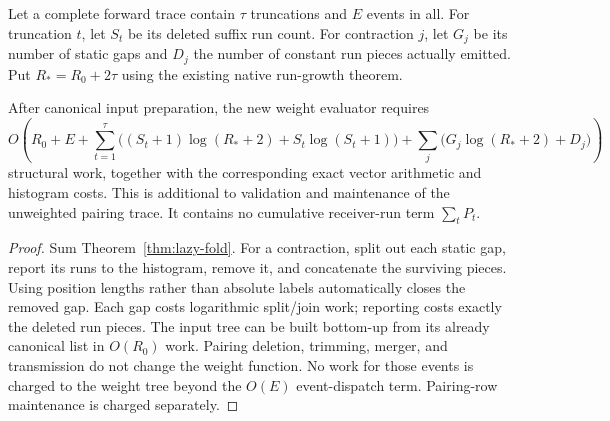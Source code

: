 Let a complete forward trace contain $\tau$ truncations and $E$ events in
all. For truncation $t$, let $S_t$ be its deleted suffix run count. For
contraction $j$, let $G_j$ be its number of static gaps and $D_j$ the number
of constant run pieces actually emitted. Put $R_* = R_0+2\tau$ using the
existing native run-growth theorem.

\begin{corollary}
\label{cor:lazy-replay}
After canonical input preparation, the new weight evaluator requires
\[
 O\left(
 R_0+E+\sum_{t=1}^{\tau}
       \bigl((S_t+1)\log(R_*+2)+S_t\log(S_t+1)\bigr)
 +\sum_j\bigl(G_j\log(R_*+2)+D_j\bigr)
 \right)
\]
structural work, together with the corresponding exact vector arithmetic
and histogram costs. This is additional to validation and maintenance of
the unweighted pairing trace. It contains no cumulative receiver-run term
$\sum_t P_t$.
\end{corollary}
\begin{proof}
Sum Theorem~\ref{thm:lazy-fold}. For a contraction, split out each static gap,
report its runs to the histogram, remove it, and concatenate the surviving
pieces. Using position lengths rather than absolute labels automatically
closes the removed gap. Each gap costs logarithmic split/join work; reporting
costs exactly the deleted run pieces. The input tree can be built bottom-up
from its already canonical list in $O(R_0)$ work. Pairing deletion, trimming,
merger, and transmission do not change the weight function. No work for
those events is charged to the weight tree beyond the $O(E)$ event-dispatch
term. Pairing-row maintenance is charged separately.
\end{proof}

